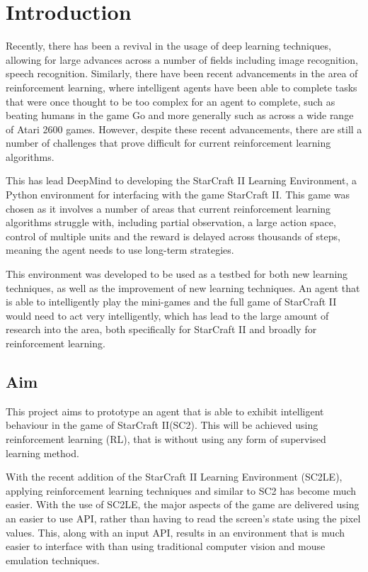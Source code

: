 \chapter{Introduction}%
\label{intro}

Recently, there has been a revival in the usage of deep
learning\cite{lecun2015deep} techniques, allowing for large advances across
a number of fields including image recognition\cite{krizhevsky2012imagenet},
speech recognition\cite{graves2013speech, hinton2012deep}. Similarly,
there have been recent advancements in the area of reinforcement learning,
where intelligent agents have been able to complete tasks that were once thought
to be too complex for an agent to complete, such as beating humans in the game
Go\cite{silver2016mastering} and more generally such as across a wide range of
Atari 2600 games\cite{mnih2015human}. However, despite these recent advancements,
there are still a number of challenges that prove difficult for current
reinforcement learning algorithms.

This has lead DeepMind\cite{deepmind} to developing the
StarCraft II Learning Environment\cite{vinyals2017starcraft}, a Python
environment for interfacing with the game StarCraft II\cite{pysc2, starcraft2}.
This game was chosen as it involves a number of areas that current reinforcement
learning algorithms struggle with, including partial observation, a large action
space, control of multiple units and the reward is delayed across thousands of
steps, meaning the agent needs to use long-term strategies.

This environment was developed to be used as a testbed for both new learning
techniques, as well as the improvement of new learning techniques. An agent
that is able to intelligently play the mini-games and the full game of
StarCraft II would need to act very intelligently, which has lead to the large
amount of research into the area, both specifically for StarCraft II and
broadly for reinforcement learning.

\section{Aim}

This project aims to prototype an agent that is able to exhibit intelligent
behaviour in the game of StarCraft II\@ (SC2). This will be achieved using
reinforcement learning (RL), that is without using any form of supervised
learning method.

With the recent addition of the StarCraft II Learning Environment (SC2LE),
applying reinforcement learning techniques and similar to SC2 has become
much easier. With the use of SC2LE, the major aspects of the game are
delivered using an easier to use API, rather than having to read the
screen's state using the pixel values. This, along with an input API,
results in an environment that is much easier to interface with than
using traditional computer vision and mouse emulation techniques.

